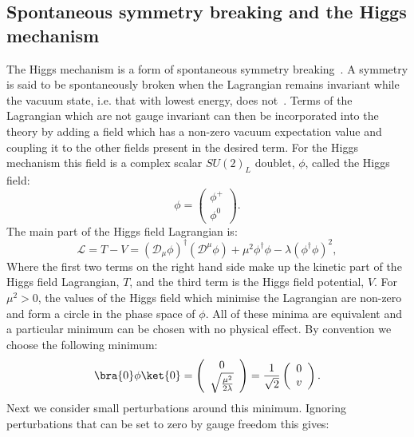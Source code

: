 \subsection{Spontaneous symmetry breaking and the Higgs mechanism}
\label{sec:ssb}
The Higgs mechanism is a form of spontaneous symmetry breaking~\cite{Englert:1964et,Higgs:1964ia,Higgs:1964pj,Guralnik:1964eu,Higgs:1966ev,Kibble:1967sv}. A symmetry is said to be spontaneously broken when the Lagrangian remains invariant while the vacuum state, i.e. that with lowest energy, does not~\cite{griffiths2008introduction}. Terms of the Lagrangian which are not gauge invariant can then be incorporated into the theory by adding a field which has a non-zero vacuum expectation value and coupling it to the other fields present in the desired term. For the Higgs mechanism this field is a complex scalar $SU\!\left(2\right)_{L}$ doublet, $\phi$, called the Higgs field:
\begin{equation}
\phi=\left(\begin{array}{c}\phi^+ \\ \phi^0 \end{array}\right).
\end{equation}
The main part of the Higgs field Lagrangian is:
\begin{equation}
  \label{eq:higlag}
\mathcal{L}=T-V=\left(\mathcal{D}_{\mu}\phi\right)^{\dag}\left(\mathcal{D}^{\mu}\phi\right)+\mu^{2}\phi^{\dag}\phi-\lambda\left(\phi^{\dag}\phi\right)^{2},
\end{equation}
Where the first two terms on the right hand side make up the kinetic part of the Higgs field Lagrangian, $T$, and the third term is the Higgs field potential, $V$. For $\mu^{2}>0$, the values of the Higgs field which minimise the Lagrangian are  non-zero and form a circle in the phase space of $\phi$. All of these minima are equivalent and a particular minimum can be chosen with no physical effect. By convention we choose the following minimum:
\begin{equation}
  \bra{0}\phi\ket{0}=\left(\begin{array}{c} 0 \\ \sqrt{\frac{\mu^{2}}{2\lambda}} \end{array}\right)=\frac{1}{\sqrt{2}}\left(\begin{array}{c} 0 \\ v \end{array}\right).
\end{equation}
Next we consider small perturbations around this minimum. Ignoring perturbations that can be set to zero by gauge freedom this gives:
